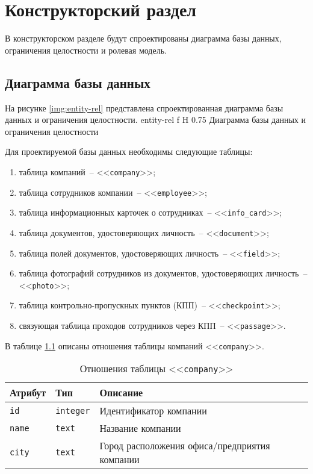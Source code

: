 \chapter{Конструкторский раздел}

В конструкторском разделе будут спроектированы диаграмма базы данных, ограничения целостности и ролевая модель.
	
\section{Диаграмма базы данных}

На рисунке \ref{img:entity-rel} представлена спроектированная диаграмма базы данных и ограничения целостности.
	{entity-rel}
	{f}
	{H}
	{0.75\textwidth}
	{Диаграмма базы данных и ограничения целостности}

Для проектируемой базы данных необходимы следующие таблицы:
\begin{enumerate}
	\item таблица компаний~-- <<\texttt{company}>>;
	\item таблица сотрудников компании~-- <<\texttt{employee}>>;
	\item таблица информационных карточек о сотрудниках~-- <<\texttt{info\_card}>>;
	\item таблица документов, удостоверяющих личность~-- <<\texttt{document}>>;
	\item таблица полей документов, удостоверяющих личность~-- <<\texttt{field}>>;
	\item таблица фотографий сотрудников из документов, удостоверяющих личность~-- <<\texttt{photo}>>;
	\item таблица контрольно-пропускных пунктов (КПП)~-- <<\texttt{checkpoint}>>;
	\item связующая таблица проходов сотрудников через КПП~-- <<\texttt{passage}>>.
\end{enumerate}

В таблице \ref{table:companyCols} описаны отношения таблицы компаний <<\texttt{company}>>.
\begin{table}[h!]
	\begin{center}
		\caption{\label{table:companyCols} Отношения таблицы <<\texttt{company}>>}
		\begin{tabularx}{\textwidth}{|X|X|X|}
			\hline
			Атрибут & Тип & Описание \\ \hline
			\texttt{id} & \texttt{integer} & Идентификатор компании \\ \hline
			\texttt{name} & \texttt{text} & Название компании \\ \hline
			\texttt{city} & \texttt{text} & Город расположения офиса/предприятия компании \\ \hline
		\end{tabularx}
	\end{center}
\end{table}

